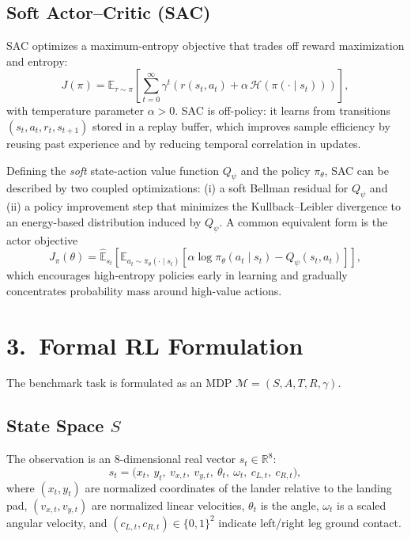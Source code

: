 \documentclass[a4paper,11pt,notitlepage]{report}
\begin{document}
\subsection{Soft Actor--Critic (SAC)}
SAC optimizes a maximum-entropy objective that trades off reward maximization and entropy:
\[
J(\pi)=\mathbb{E}_{\tau\sim \pi}\left[\sum_{t=0}^{\infty}\gamma^t\left(r(s_t,a_t)+\alpha\,\mathcal{H}(\pi(\cdot\mid s_t))\right)\right],
\]
with temperature parameter $\alpha>0$. SAC is off-policy: it learns from transitions $(s_t,a_t,r_t,s_{t+1})$ stored in a replay buffer, which improves sample efficiency by reusing past experience and by reducing temporal correlation in updates.

Defining the \emph{soft} state-action value function $Q_\psi$ and the policy $\pi_\theta$, SAC can be described by two coupled optimizations: (i) a soft Bellman residual for $Q_\psi$ and (ii) a policy improvement step that minimizes the Kullback--Leibler divergence to an energy-based distribution induced by $Q_\psi$. A common equivalent form is the actor objective
\[
J_\pi(\theta)=\hat{\mathbb{E}}_{s_t}\left[\mathbb{E}_{a_t\sim \pi_\theta(\cdot\mid s_t)}\left[\alpha\log \pi_\theta(a_t\mid s_t)-Q_\psi(s_t,a_t)\right]\right],
\]
which encourages high-entropy policies early in learning and gradually concentrates probability mass around high-value actions.

\section{3.\ Formal RL Formulation}
The benchmark task is formulated as an MDP $\mathcal{M}=(S,A,T,R,\gamma)$.

\subsection{State Space \texorpdfstring{$S$}{S}}
The observation is an $8$-dimensional real vector $s_t\in \mathbb{R}^{8}$:
\[
s_t=\big(x_t,\ y_t,\ v_{x,t},\ v_{y,t},\ \theta_t,\ \omega_t,\ c_{L,t},\ c_{R,t}\big),
\]
where $(x_t,y_t)$ are normalized coordinates of the lander relative to the landing pad, $(v_{x,t},v_{y,t})$ are normalized linear velocities, $\theta_t$ is the angle, $\omega_t$ is a scaled angular velocity, and $(c_{L,t},c_{R,t})\in\{0,1\}^2$ indicate left/right leg ground contact.
\end{document}

